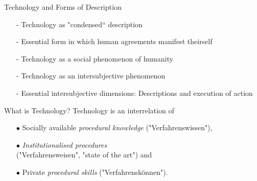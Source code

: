 \documentclass{beamer}
\begin{document}
\begin{frame}{Technology and Forms of Description}
  \begin{itemize}
  \item[-] Technology as "condensed“ description
  \item[-] Essential form in which human agreements manifest theirself
  \item[-] Technology as a social phenomenon of humanity
  \item[-] Technology as an intersubjective phenomenon
  \item[-] Essential intersubjective dimensions: Descriptions and execution of
    action
  \end{itemize}
  \begin{block}{What is Technology?} 
    Technology is an interrelation of
    \begin{itemize}
    \item[$\bullet$] Socially available \emph{procedural knowledge}
      ("Verfahrenswissen"), 
    \item[$\bullet$] \emph{Institutionalised
      procedures}\\ ("Verfahrensweisen", "state of the art") and
    \item[$\bullet$] Private \emph{procedural skills} ("Verfahrenskönnen").
    \end{itemize}
  \end{block}
\end{frame}
\end{document}

